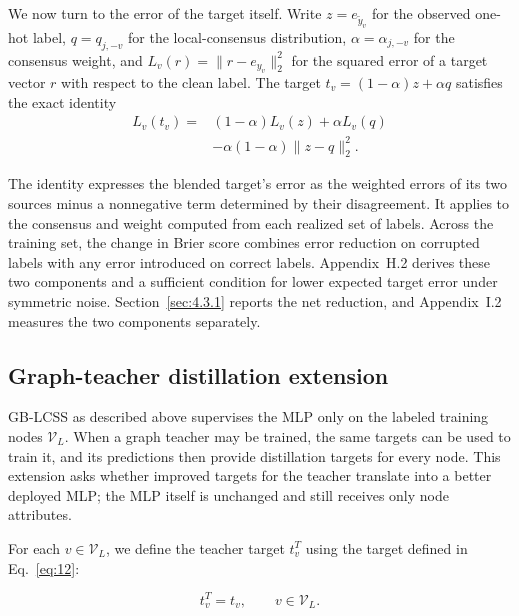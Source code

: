 \documentclass[10pt,letterpaper,nopreprintline]{elsarticle}
\theoremstyle{plain}
\begin{document}
\Needspace{100pt}
We now turn to the error of the target itself. Write \(z=e_{\widetilde y_v}\) for the observed one-hot label, \(q=q_{j,-v}\) for the local-consensus distribution, \(\alpha=\alpha_{j,-v}\) for the consensus weight, and \(L_v(r)=\lVert r-e_{y_v}\rVert_2^2\) for the squared error of a target vector \(r\) with respect to the clean label. The target \(t_v=(1-\alpha)z+\alpha q\) satisfies the exact identity
\begin{equation}\label{eq:16}
\begin{aligned}
L_v(t_v)={}&(1-\alpha)L_v(z)+\alpha L_v(q)\\
&-\alpha(1-\alpha)\lVert z-q\rVert_2^2.
\end{aligned}
\end{equation}

The identity expresses the blended target's error as the weighted errors of its two sources minus a nonnegative term determined by their disagreement. It applies to the consensus and weight computed from each realized set of labels. Across the training set, the change in Brier score combines error reduction on corrupted labels with any error introduced on correct labels. Appendix~H.2 derives these two components and a sufficient condition for lower expected target error under symmetric noise. Section~\ref{sec:4.3.1} reports the net reduction, and Appendix~I.2 measures the two components separately.


\subsection{Graph-teacher distillation extension}\label{sec:3.5}

GB-LCSS as described above supervises the MLP only on the labeled training nodes \(\mathcal{V}_{L}\). When a graph teacher may be trained, the same targets can be used to train it, and its predictions then provide distillation targets for every node. This extension asks whether improved targets for the teacher translate into a better deployed MLP; the MLP itself is unchanged and still receives only node attributes.

\Needspace{64pt}

For each \(v \in \mathcal{V}_{L}\), we define the teacher target \(t_{v}^{T}\) using the target defined in Eq.~\eqref{eq:12}:

\begin{equation}\label{eq:17}
t_{v}^{T} = t_{v},\qquad v \in \mathcal{V}_{L}.
\end{equation}
\end{document}
